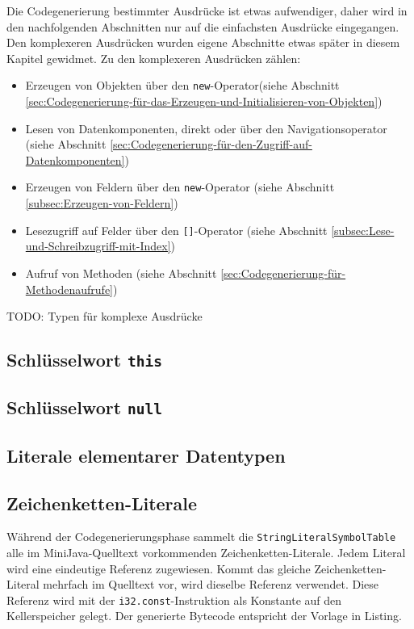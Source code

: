 Die Codegenerierung bestimmter Ausdrücke ist etwas aufwendiger, daher wird in den nachfolgenden Abschnitten nur auf die einfachsten Ausdrücke eingegangen. Den komplexeren Ausdrücken wurden eigene Abschnitte etwas später in diesem Kapitel gewidmet. Zu den komplexeren Ausdrücken zählen: 
\begin{itemize}
    \item Erzeugen von Objekten über den \lstinline{new}-Operator(siehe Abschnitt \ref{sec:Codegenerierung-für-das-Erzeugen-und-Initialisieren-von-Objekten})
    \item Lesen von Datenkomponenten, direkt oder über den Navigationsoperator (siehe Abschnitt \ref{sec:Codegenerierung-für-den-Zugriff-auf-Datenkomponenten})
    \item Erzeugen von Feldern über den \lstinline{new}-Operator (siehe Abschnitt \ref{subsec:Erzeugen-von-Feldern})
    \item Lesezugriff auf Felder über den \lstinline{[]}-Operator (siehe Abschnitt \ref{subsec:Lese-und-Schreibzugriff-mit-Index})
    \item Aufruf von Methoden (siehe Abschnitt \ref{sec:Codegenerierung-für-Methodenaufrufe})
\end{itemize}
TODO: Typen für komplexe Ausdrücke

\subsection{Schlüsselwort \lstinline{this}}
\subsection{Schlüsselwort \lstinline{null}}
\subsection{Literale elementarer Datentypen}
\subsection{Zeichenketten-Literale}

Während der Codegenerierungsphase sammelt die \lstinline{StringLiteralSymbolTable} alle im MiniJava-Quelltext vorkommenden Zeichenketten-Literale. Jedem Literal wird eine eindeutige Referenz zugewiesen. Kommt das gleiche Zeichenketten-Literal mehrfach im Quelltext vor, wird dieselbe Referenz verwendet. Diese Referenz wird mit der \lstinline{i32.const}-Instruktion als Konstante auf den Kellerspeicher gelegt. Der generierte Bytecode entspricht der Vorlage in Listing.

